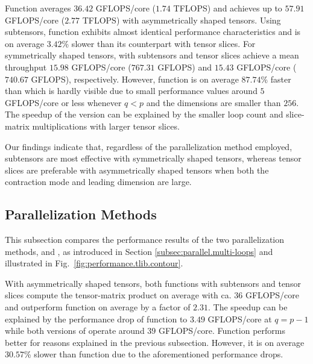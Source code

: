 Function  averages $36.42$ GFLOPS/core ($1.74$ TFLOPS) and achieves up to $57.91$ GFLOPS/core ($2.77$ TFLOPS) with asymmetrically shaped tensors.
Using subtensors, function  exhibits almost identical performance characteristics and is on average $3.42$\% slower than its counterpart with tensor slices.
For symmetrically shaped tensors,  with subtensors and tensor slices achieve a mean throughput $15.98$ GFLOPS/core ($767.31$ GFLOPS) and $15.43$ GFLOPS/core ($740.67$ GFLOPS), respectively.
However, function  is on average $87.74$\% faster than  which is hardly visible due to small performance values around $5$ GFLOPS/core or less whenever $q<p$ and the dimensions are smaller than $256$.
The speedup of the  version can be explained by the smaller loop count and slice-matrix multiplications with larger tensor slices.

Our findings indicate that, regardless of the parallelization method employed, subtensors are most effective with symmetrically shaped tensors, whereas tensor slices are preferable with asymmetrically shaped tensors when both the contraction mode and leading dimension are large.



\subsection{Parallelization Methods}
\label{subsec:results.parallelization-methods}
This subsection compares the performance results of the two parallelization methods,  and , as introduced in Section \ref{subsec:parallel.multi-loops} and illustrated in Fig.~\ref{fig:performance.tlib.contour}.

With asymmetrically shaped tensors, both  functions with subtensors and tensor slices compute the tensor-matrix product on average with ca. $36$ GFLOPS/core and outperform function  on average by a factor of $2.31$.
The speedup can be explained by the performance drop of function  to $3.49$ GFLOPS/core at $q=p-1$ while both versions of  operate around $39$ GFLOPS/core.
Function  performs better for reasons explained in the previous subsection.
However, it is on average $30.57$\% slower than function  due to the aforementioned performance drops.

